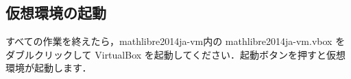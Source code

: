 \documentclass[a4j]{jsarticle}
\newcommand{\vm}{mathlibre2014ja-vm}
\begin{document}

\subsection{仮想環境の起動}
すべての作業を終えたら，\vm 内の \vm.vbox をダブルクリックして
VirtualBox を起動してください．起動ボタンを押すと仮想環境が起動します．

\end{document}
